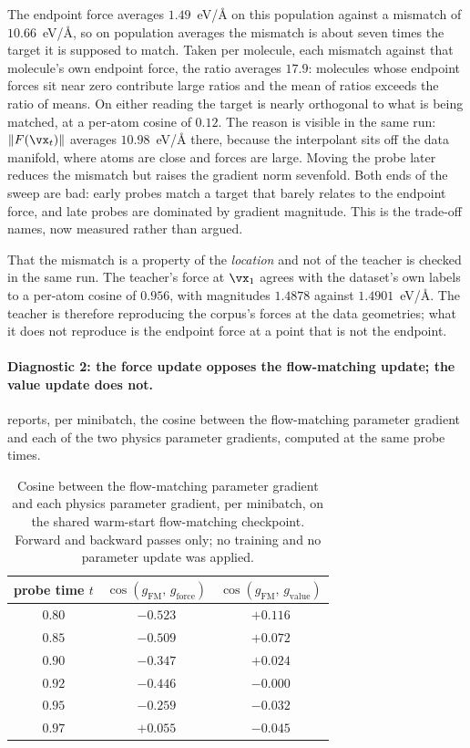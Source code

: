 The endpoint force averages $1.49$~eV/\AA{} on this population against a mismatch of
$10.66$~eV/\AA{}, so on population averages the mismatch is about seven times the target it
is supposed to match. Taken per molecule, each mismatch against that molecule's own endpoint
force, the ratio averages $17.9$: molecules whose endpoint forces sit near zero contribute
large ratios and the mean of ratios exceeds the ratio of means. On either reading the target
is nearly orthogonal to what is being matched, at a per-atom cosine of $0.12$. The reason is visible in the same run:
$\|F(\vx_t)\|$ averages $10.98$~eV/\AA{} there, because the interpolant sits off the data
manifold, where atoms are close and forces are large. Moving the probe later reduces the
mismatch but raises the gradient norm sevenfold. Both ends of the sweep are bad: early
probes match a target that barely relates to the endpoint force, and late probes are
dominated by gradient magnitude. This is the trade-off  names, now
measured rather than argued.

That the mismatch is a property of the \emph{location} and not of the teacher is checked
in the same run. The teacher's force at $\vx_1$ agrees with the dataset's own labels to a
per-atom cosine of $0.956$, with magnitudes $1.4878$ against $1.4901$~eV/\AA. The teacher
is therefore reproducing the corpus's forces at the data geometries; what it does not
reproduce is the endpoint force at a point that is not the endpoint.

\paragraph{Diagnostic 2: the force update opposes the flow-matching update; the value
update does not.}  reports, per minibatch, the cosine between the
flow-matching parameter gradient and each of the two physics parameter gradients,
computed at the same probe times.

\begin{table}[h]
\caption{Cosine between the flow-matching parameter gradient and each physics parameter
gradient, per minibatch, on the shared warm-start flow-matching checkpoint. Forward and
backward passes only; no training and no parameter update was applied.}
\label{tab:gradcos}
\begin{center}
\footnotesize
\begin{tabular}{ccc}
\toprule
probe time $t$ & $\cos(g_{\mathrm{FM}},\,g_{\mathrm{force}})$ & $\cos(g_{\mathrm{FM}},\,g_{\mathrm{value}})$ \\
\midrule
$0.80$ & $-0.523$ & $+0.116$ \\
$0.85$ & $-0.509$ & $+0.072$ \\
$0.90$ & $-0.347$ & $+0.024$ \\
$0.92$ & $-0.446$ & $-0.000$ \\
$0.95$ & $-0.259$ & $-0.032$ \\
$0.97$ & $+0.055$ & $-0.045$ \\
\bottomrule
\end{tabular}
\end{center}
\end{table}

